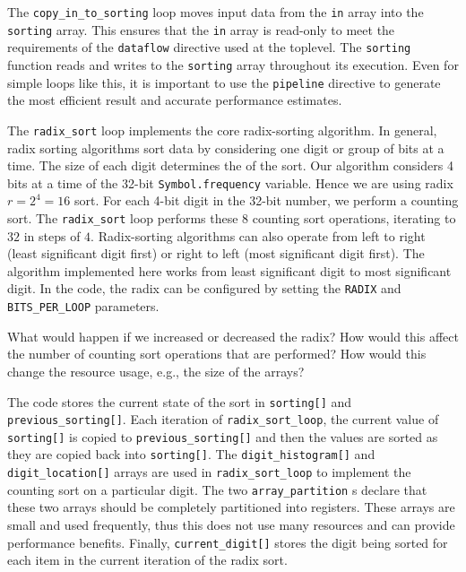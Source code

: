 The \lstinline{copy_in_to_sorting} loop moves input data from the \lstinline{in} array into the \lstinline{sorting} array.  This ensures that the \lstinline{in} array is read-only to meet the requirements of the \lstinline{dataflow} directive used at the toplevel. The \lstinline{sorting} function reads and writes to the \lstinline{sorting} array throughout its execution. Even for simple loops like this, it is important to use the \lstinline{pipeline} directive to generate the most efficient result and accurate performance estimates.

The \lstinline{radix_sort} loop implements the core radix-sorting algorithm.   In general, radix sorting algorithms sort data by considering one digit or group of bits at a time.  The size of each digit determines the  of the sort.  Our algorithm considers 4 bits at a time of the 32-bit \lstinline{Symbol.frequency} variable.  Hence we are using radix $r=2^{4}=16$ sort.  For each 4-bit digit in the 32-bit number, we perform a counting sort. The \lstinline{radix_sort} loop performs these 8 counting sort operations, iterating to $32$ in steps of $4$.   Radix-sorting algorithms can also operate from left to right (least significant digit first) or right to left (most significant digit first).   The algorithm implemented here works from least significant digit to most significant digit.   In the code, the radix can be configured by setting the \lstinline{RADIX} and \lstinline{BITS_PER_LOOP} parameters. 

\begin{exercise}
What would happen if we increased or decreased the radix? How would this affect the number of counting sort operations that are performed? How would this change the resource usage, e.g., the size of the arrays?
\end{exercise}

The code stores the current state of the sort in \lstinline{sorting[]} and \lstinline{previous_sorting[]}.  Each iteration of \lstinline{radix_sort_loop}, the current value of \lstinline{sorting[]} is copied to \lstinline{previous_sorting[]} and then the values are sorted as they are copied back into \lstinline{sorting[]}.  The \lstinline{digit_histogram[]} and \lstinline{digit_location[]} arrays are used in \lstinline{radix_sort_loop} to implement the counting sort on a particular digit. The two \lstinline{array_partition} s declare that these two arrays should be completely partitioned into registers. These arrays are small and used frequently, thus this does not use many resources and can provide performance benefits. Finally, \lstinline{current_digit[]} stores the digit being sorted for each item in the current iteration of the radix sort.

